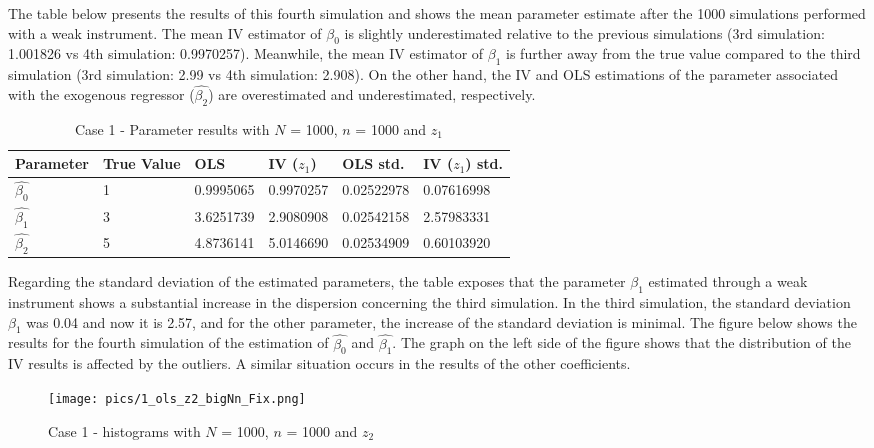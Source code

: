 \documentclass{article}
\begin{document}
\newline
The table below presents the results of this fourth simulation and shows the mean parameter estimate after the 1000 simulations performed with a weak instrument. The mean IV estimator of $\beta_{0}$ is slightly underestimated relative to the previous simulations (3rd simulation: 1.001826 vs 4th simulation: 0.9970257). Meanwhile, the mean IV estimator of $\beta_{1}$ is further away from the true value compared to the third simulation (3rd simulation: 2.99 vs 4th simulation: 2.908). On the other hand, the IV and OLS estimations of the parameter associated with the exogenous regressor ($\hat{\beta_{2}}$) are overestimated and underestimated, respectively.
\newline
\begin{table}[h!]
\centering
\begin{tabular}{ | m{2cm} | m{2cm}|  m{2cm}| m{2cm}|  m{2cm}| m{2cm}|} 
  \hline
  Parameter & True Value & OLS & IV ($z_{1}$) & OLS std. & IV ($z_{1}$) std.\\ 
  \hline
  $\hat{\beta_{0}}$ & 1 & 0.9995065 & 0.9970257 & 0.02522978 & 0.07616998 \\ 
  \hline
  $\hat{\beta_{1}}$ & 3 & 3.6251739 & 2.9080908 & 0.02542158 & 2.57983331 \\
  \hline
  $\hat{\beta_{2}}$ & 5 & 4.8736141 & 5.0146690 & 0.02534909 & 0.60103920 \\
  \hline
\end{tabular}
\caption{Case 1 - Parameter results with $N$ = 1000, $n$ = 1000 and $z_{1}$}
\label{table:4}
\end{table}
\newline
Regarding the standard deviation of the estimated parameters, the table exposes that the parameter $\beta_{1}$ estimated through a weak instrument shows a substantial increase in the dispersion concerning the third simulation. In the third simulation, the standard deviation $\beta_{1}$ was 0.04 and now it is 2.57, and for the other parameter, the increase of the standard deviation is minimal.
\newline
The figure below shows the results for the fourth simulation of the estimation of $\hat{\beta_{0}}$ and $\hat{\beta_{1}}$. The graph on the left side of the figure shows that the distribution of the IV results is affected by the outliers. A similar situation occurs in the results of the other coefficients. 
\begin{figure}[h]
\centering
\texttt{[image: pics/1\_ols\_z2\_bigNn\_Fix.png]}
\caption{Case 1 - histograms with $N$ = 1000, $n$ = 1000 and $z_{2}$}
\label{fig:image2}
\end{figure}
\end{document}
